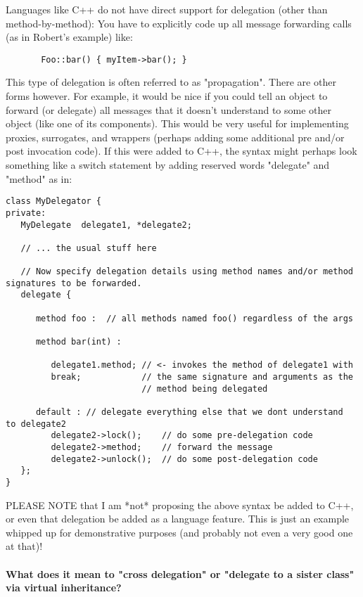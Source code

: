 \documentclass{book}
\begin{document}
Languages like C++ do not have direct support for delegation (other than method-by-method): You have to explicitly code up all message
forwarding calls (as in Robert's example) like:
\begin{verbatim}
       Foo::bar() { myItem->bar(); }
\end{verbatim}
This type of delegation is often referred to as "propagation". There are other forms however. For example, it would be nice if you could
tell an object to forward (or delegate) all messages that it doesn't understand to some other object (like one of its components). This
would be very useful for implementing proxies, surrogates, and wrappers (perhaps adding some additional pre and/or post invocation
code). If this were added to C++, the syntax might perhaps look something like a switch statement by adding reserved words "delegate"
and "method" as in:
\begin{lstlisting}[caption={Delegation pseudocode in C++}]
class MyDelegator {
private:
   MyDelegate  delegate1, *delegate2;

   // ... the usual stuff here

   // Now specify delegation details using method names and/or method signatures to be forwarded.
   delegate {

      method foo :  // all methods named foo() regardless of the args

      method bar(int) :

         delegate1.method; // <- invokes the method of delegate1 with
         break;            // the same signature and arguments as the
                           // method being delegated

      default : // delegate everything else that we dont understand  to delegate2
         delegate2->lock();    // do some pre-delegation code
         delegate2->method;    // forward the message
         delegate2->unlock();  // do some post-delegation code
   };
}
\end{lstlisting}
PLEASE NOTE that I am *not* proposing the above syntax be added to C++, or even that delegation be added as a language feature. This is
just an example whipped up for demonstrative purposes (and probably not even a very good one at that)!

\paragraph{What does it mean to "cross delegation" or "delegate to a sister class" via virtual inheritance? }
\end{document}
